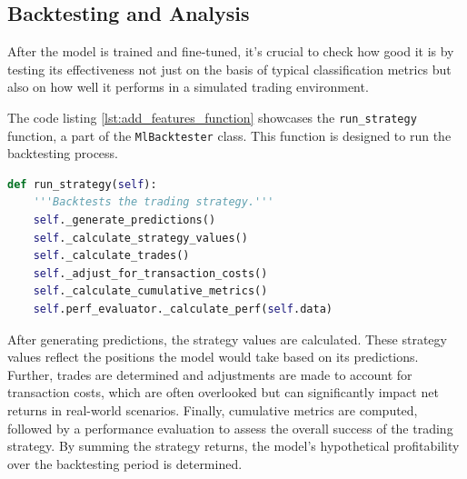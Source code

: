 \subsection{Backtesting and Analysis}
After the model is trained and fine-tuned, it's crucial to check how good it is by testing its effectiveness not just on the basis of typical classification metrics but also on how well it performs in a simulated trading environment.

The code listing \ref{lst:add_features_function} showcases the \texttt{run\_strategy} function, a part of the \texttt{MlBacktester} class.
This function is designed to run the backtesting process.



\noindent\begin{minipage}{\linewidth}
\begin{lstlisting}[style=pythonstyle, language=Python, caption={\vspace*{1cm}Function of MlBacktester class for backtesting execution.},  captionpos=b, label=lst:add_features_function]
def run_strategy(self):
    '''Backtests the trading strategy.'''
    self._generate_predictions()
    self._calculate_strategy_values()
    self._calculate_trades()
    self._adjust_for_transaction_costs()
    self._calculate_cumulative_metrics()
    self.perf_evaluator._calculate_perf(self.data)

\end{lstlisting}
\end{minipage}


After generating predictions, the strategy values are calculated.
These strategy values reflect the positions the model would take based on its predictions.
Further, trades are determined and adjustments are made to account for transaction costs, which are often overlooked but can significantly impact net returns in real-world scenarios.
Finally, cumulative metrics are computed, followed by a performance evaluation to assess the overall success of the trading strategy.
By summing the strategy returns, the model's hypothetical profitability over the backtesting period is determined.

